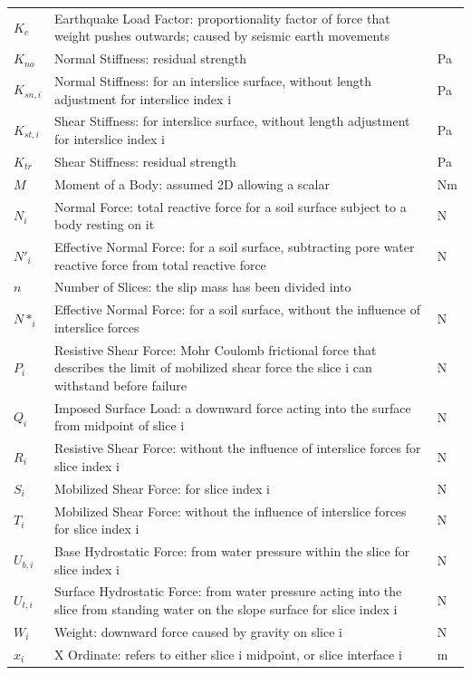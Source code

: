 \documentclass[12pt]{article}
\begin{document}
\begin{longtable*}{l l l}
\\
$K_{c}$ & Earthquake Load Factor: proportionality factor of force that weight pushes outwards; caused by seismic earth movements & 
\\
$K_{no}$ & Normal Stiffness: residual strength & Pa
\\
$K_{sn,i}$ & Normal Stiffness: for an interslice surface, without length adjustment for interslice index i & Pa
\\
$K_{st,i}$ & Shear Stiffness: for interslice surface, without length adjustment for interslice index i & Pa
\\
$K_{tr}$ & Shear Stiffness: residual strength & Pa
\\
$M$ & Moment of a Body: assumed 2D allowing a scalar & Nm
\\
$N_{i}$ & Normal Force: total reactive force for a soil surface subject to a body resting on it & N
\\
$N'_{i}$ & Effective Normal Force: for a soil surface, subtracting pore water reactive force from total reactive force & N
\\
$n$ & Number of Slices: the slip mass has been divided into & 
\\
$N*_{i}$ & Effective Normal Force: for a soil surface, without the influence of interslice forces & N
\\
$P_{i}$ & Resistive Shear Force: Mohr Coulomb frictional force that describes the limit of mobilized shear force the slice i can withstand before failure & N
\\
$Q_{i}$ & Imposed Surface Load: a downward force acting into the surface from midpoint of slice i & N
\\
$R_{i}$ & Resistive Shear Force: without the influence of interslice forces for slice index i & N
\\
$S_{i}$ & Mobilized Shear Force: for slice index i & N
\\
$T_{i}$ & Mobilized Shear Force: without the influence of interslice forces for slice index i & N
\\
$U_{b,i}$ & Base Hydrostatic Force: from water pressure within the slice for slice index i & N
\\
$U_{t,i}$ & Surface Hydrostatic Force: from water pressure acting into the slice from standing water on the slope surface for slice index i & N
\\
$W_{i}$ & Weight: downward force caused by gravity on slice i & N
\\
$x_{i}$ & X Ordinate: refers to either slice i midpoint, or slice interface i & m

\end{longtable*}
\end{document}
